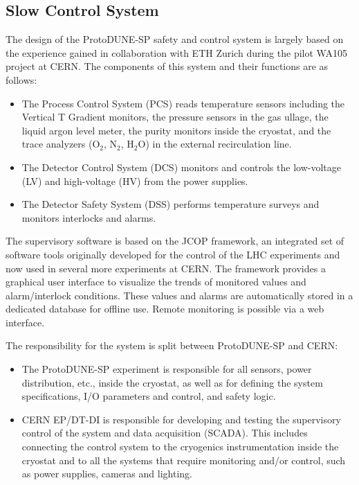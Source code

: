 \subsection{Slow Control System}
\label{sec:slowcontrol}

The design of the ProtoDUNE-SP safety and control system is largely based on the experience gained in collaboration with ETH Zurich during the pilot WA105 project at CERN. The components of this system and their functions are as follows:
\begin{itemize}
\item	The Process Control System (PCS) reads temperature sensors including the Vertical T Gradient monitors, 
the pressure sensors in the gas ullage, the liquid argon level meter,
the purity monitors inside the cryostat, and the trace analyzers (O$_2$, N$_2$, H$_2$O) in the external recirculation line.
\item	The Detector Control System (DCS) monitors and controls the low-voltage (LV) and high-voltage (HV) from the power supplies.
\item	The Detector Safety System (DSS) performs temperature surveys and monitors interlocks and alarms.
\end{itemize}

The supervisory software is based on the JCOP framework, an integrated set of software tools originally developed for the control of the LHC experiments and 
now used in several more experiments at CERN. The framework provides a graphical user interface to visualize the trends of monitored values and 
alarm/interlock conditions. These values and alarms are automatically stored in a dedicated database for offline use. Remote monitoring is possible via a web 
interface.

The responsibility for the system is split between ProtoDUNE-SP and CERN: 
\begin{itemize}
\item The ProtoDUNE-SP experiment is responsible for all sensors, power distribution, etc., inside the cryostat, 
as well as for defining the system specifications, I/O parameters and control, and safety logic. 
\item CERN EP/DT-DI  is responsible for developing and testing the supervisory control of the system and data acquisition (SCADA).
This includes connecting the control system to the cryogenics instrumentation inside the cryostat and to all the systems that require monitoring and/or control, such as power supplies, cameras and lighting. 
\end{itemize}

